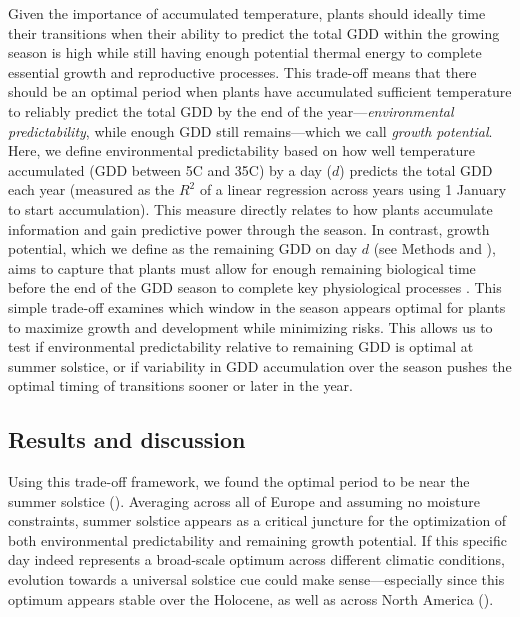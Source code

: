 \documentclass[11pt,letter]{article}
\newcommand{\llabel}[1]{\hypertarget{lintarget:#1}{}\linelabel{lin:#1}}
\begin{document}
Given the importance of accumulated temperature, plants should ideally time their transitions when their ability to predict the total GDD within the growing season is high while still having enough potential thermal energy to complete essential growth and reproductive processes. This trade-off means that there should be an optimal period when plants have accumulated sufficient temperature to reliably predict the total GDD by the end of the year---\emph{environmental predictability}, while enough GDD still remains---which we call \emph{growth potential}. Here, we define environmental predictability based on how well temperature accumulated \llabel{range}(GDD between 5\degree C and 35\degree C) by a day ($d$) predicts the total GDD each year (measured as the $R^2$ of a linear regression across years using 1 January to start accumulation). This measure directly relates to how plants accumulate information and gain predictive power through the season.
In contrast, growth potential, which we define as the remaining GDD on day $d$ (see Methods and ), aims to capture that plants must allow for enough remaining biological time before the end of the GDD season to complete key physiological processes \citep{Zohner2023, Journe2024}. 
This simple trade-off examines which window in the season appears optimal for plants to maximize growth and development while minimizing risks. This allows us to test if environmental predictability relative to remaining GDD is optimal at summer solstice, or if variability in GDD accumulation over the season pushes the optimal timing of transitions sooner or later in the year. 

\subsection*{Results and discussion}

Using this trade-off framework, we found the optimal period to be near the summer solstice (). Averaging across all of Europe and assuming \llabel{moist4}no moisture constraints, summer solstice appears as a critical juncture for the optimization of both environmental predictability and remaining growth potential.
If this specific day indeed represents a broad-scale optimum across different climatic conditions, evolution towards a universal solstice cue could make sense---especially since this optimum appears stable over the Holocene, as well as across North America ().
\end{document}
